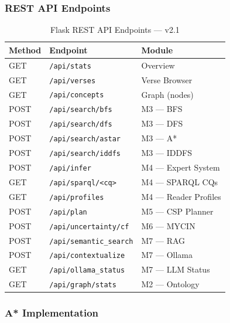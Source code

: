 \documentclass[conference]{IEEEtran}
\begin{document}
\subsubsection{REST API Endpoints}

\begin{table}[!t]
\caption{Flask REST API Endpoints — v2.1}
\label{tab:api}
\centering
\small
\begin{tabular}{@{}l l l@{}}
\toprule
\textbf{Method} & \textbf{Endpoint} & \textbf{Module} \\
\midrule
GET  & \texttt{/api/stats}           & Overview \\
GET  & \texttt{/api/verses}          & Verse Browser \\
GET  & \texttt{/api/concepts}        & Graph (nodes) \\
POST & \texttt{/api/search/bfs}      & M3 — BFS \\
POST & \texttt{/api/search/dfs}      & M3 — DFS \\
POST & \texttt{/api/search/astar}    & M3 — A* \\
POST & \texttt{/api/search/iddfs}    & M3 — IDDFS \\
POST & \texttt{/api/infer}           & M4 — Expert System \\
GET  & \texttt{/api/sparql/<cq>}     & M4 — SPARQL CQs \\
GET  & \texttt{/api/profiles}        & M4 — Reader Profiles \\
POST & \texttt{/api/plan}            & M5 — CSP Planner \\
POST & \texttt{/api/uncertainty/cf}  & M6 — MYCIN \\
POST & \texttt{/api/semantic\_search}& M7 — RAG \\
POST & \texttt{/api/contextualize}   & M7 — Ollama \\
GET  & \texttt{/api/ollama\_status}  & M7 — LLM Status \\
GET  & \texttt{/api/graph/stats}     & M2 — Ontology \\
\bottomrule
\end{tabular}
\end{table}

\subsubsection{A* Implementation}
\end{document}
